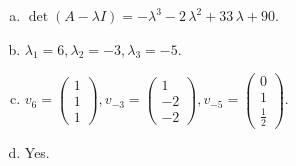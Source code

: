 \begin{questions}
\begin{solution}
\begin{enumerate}[(a)]
\item $\det(A-\lambda I)=-{\lambda}^{3} - 2 \, {\lambda}^{2} + 33 \, {\lambda} + 90$.
\item ${\lambda}_1=6, {\lambda}_2=-3, {\lambda}_3=-5$.
\item $v_{6}=\left(\begin{array}{r}
1 \\
1 \\
1
\end{array}\right), v_{-3}=\left(\begin{array}{r}
1 \\
-2 \\
-2
\end{array}\right), v_{-5}=\left(\begin{array}{r}
0 \\
1 \\
\frac{1}{2}
\end{array}\right)$.
\item Yes.
\end{enumerate}
\end{solution}

\end{questions}

\newpage


\begin{center}
\end{center}

